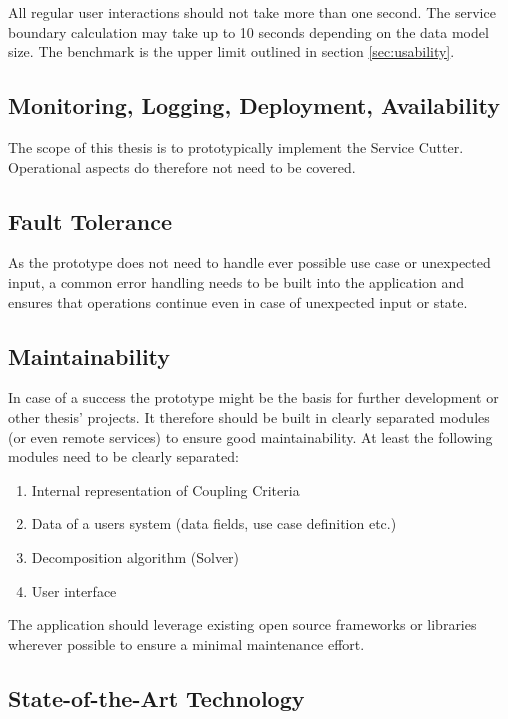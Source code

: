 All regular user interactions should not take more than one second. The service boundary calculation may take up to 10 seconds depending on the data model size. The benchmark is the upper limit outlined in section \ref{sec:usability}.

\subsection{Monitoring, Logging, Deployment, Availability}

The scope of this thesis is to prototypically implement the Service Cutter. Operational aspects do therefore not need to be covered. 

\subsection{Fault Tolerance}

As the prototype does not need to handle ever possible use case or unexpected input, a common error handling needs to be built into the application and ensures that operations continue even in case of unexpected input or state.

\subsection{Maintainability}

In case of a success the prototype might be the basis for further development or other thesis' projects. It therefore should be built in clearly separated modules (or even remote services) to ensure good maintainability. At least the following modules need to be clearly separated:


\begin{enumerate}
	\item Internal representation of Coupling Criteria
	\item Data of a users system (data fields, use case definition etc.) 
	\item Decomposition algorithm (Solver)
	\item User interface
\end{enumerate}

The application should leverage existing open source frameworks or libraries wherever possible to ensure a minimal maintenance effort.

\subsection{State-of-the-Art Technology}

